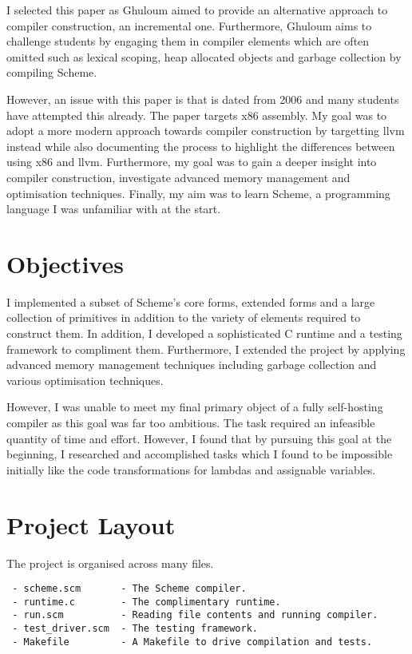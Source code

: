 \documentclass{article}
\begin{document}
I selected this paper as Ghuloum aimed to provide an alternative approach to compiler construction, an incremental one. Furthermore, Ghuloum aims to challenge students by engaging them in compiler elements which are often omitted such as lexical scoping, heap allocated objects and garbage collection by compiling Scheme.

However, an issue with this paper is that is dated from 2006 and many students have attempted this already. The paper targets x86 assembly. My goal was to adopt a more modern approach towards compiler construction by targetting llvm instead while also documenting the process to highlight the differences between using x86 and llvm. Furthermore, my goal was to gain a deeper insight into compiler construction, investigate advanced memory management and optimisation techniques. Finally, my aim was to learn Scheme, a programming language I was unfamiliar with at the start. 

\section{Objectives}

I implemented a subset of Scheme's core forms, extended forms and a large collection of primitives in addition to the variety of elements required to construct them. In addition, I developed a sophisticated C runtime and a testing framework to compliment them. Furthermore, I extended the project by applying advanced memory management techniques including garbage collection and various optimisation techniques.

However, I was unable to meet my final primary object of a fully self-hosting compiler as this goal was far too ambitious. The task required an infeasible quantity of time and effort. However, I found that by pursuing this goal at the beginning, I researched and accomplished tasks which I found to be impossible initially like the code transformations for lambdas and assignable variables.

\section{Project Layout}

The project is organised across many files.

\begin{verbatim}
 - scheme.scm       - The Scheme compiler.
 - runtime.c        - The complimentary runtime.
 - run.scm          - Reading file contents and running compiler.
 - test_driver.scm  - The testing framework.
 - Makefile         - A Makefile to drive compilation and tests. 
\end{verbatim}
\end{document}
